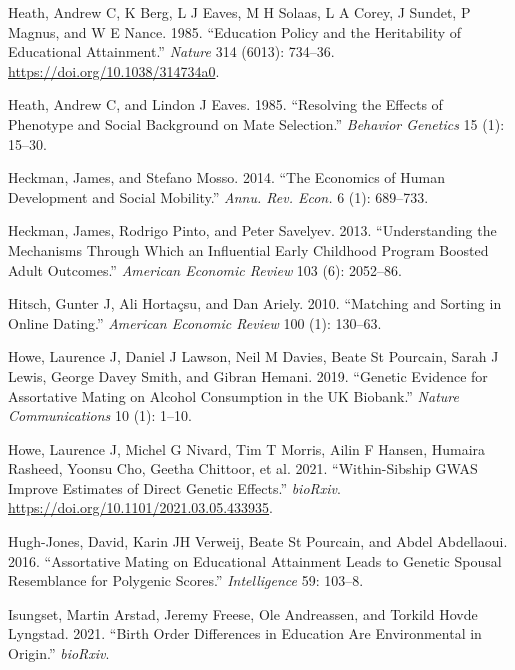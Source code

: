 \documentclass[
  12pt,
]{article}
\newlength{\cslhangindent}
\newlength{\cslentryspacingunit} %
\newenvironment{CSLReferences}[2] %
 {%
  \setlength{\parindent}{0pt}
  \ifodd #1
  \let\oldpar\par
  \def\par{\hangindent=\cslhangindent\oldpar}
  \fi
  \setlength{\parskip}{#2\cslentryspacingunit}
 }%
 {}
\theoremstyle{definition}
\theoremstyle{definition}
\theoremstyle{definition}
\theoremstyle{definition}
\theoremstyle{remark}
\begin{document}
\begin{CSLReferences}{1}{0}
\leavevmode{}%
Heath, Andrew C, K Berg, L J Eaves, M H Solaas, L A Corey, J Sundet, P Magnus, and W E Nance. 1985. {``Education Policy and the Heritability of Educational Attainment.''} \emph{Nature} 314 (6013): 734--36. \url{https://doi.org/10.1038/314734a0}.

\leavevmode{}%
Heath, Andrew C, and Lindon J Eaves. 1985. {``Resolving the Effects of Phenotype and Social Background on Mate Selection.''} \emph{Behavior Genetics} 15 (1): 15--30.

\leavevmode{}%
Heckman, James, and Stefano Mosso. 2014. {``The Economics of Human Development and Social Mobility.''} \emph{Annu. Rev. Econ.} 6 (1): 689--733.

\leavevmode{}%
Heckman, James, Rodrigo Pinto, and Peter Savelyev. 2013. {``Understanding the Mechanisms Through Which an Influential Early Childhood Program Boosted Adult Outcomes.''} \emph{American Economic Review} 103 (6): 2052--86.

\leavevmode{}%
Hitsch, Gunter J, Ali Hortaçsu, and Dan Ariely. 2010. {``Matching and Sorting in Online Dating.''} \emph{American Economic Review} 100 (1): 130--63.

\leavevmode{}%
Howe, Laurence J, Daniel J Lawson, Neil M Davies, Beate St Pourcain, Sarah J Lewis, George Davey Smith, and Gibran Hemani. 2019. {``Genetic Evidence for Assortative Mating on Alcohol Consumption in the UK Biobank.''} \emph{Nature Communications} 10 (1): 1--10.

\leavevmode{}%
Howe, Laurence J, Michel G Nivard, Tim T Morris, Ailin F Hansen, Humaira Rasheed, Yoonsu Cho, Geetha Chittoor, et al. 2021. {``Within-Sibship GWAS Improve Estimates of Direct Genetic Effects.''} \emph{bioRxiv}. \url{https://doi.org/10.1101/2021.03.05.433935}.

\leavevmode{}%
Hugh-Jones, David, Karin JH Verweij, Beate St Pourcain, and Abdel Abdellaoui. 2016. {``Assortative Mating on Educational Attainment Leads to Genetic Spousal Resemblance for Polygenic Scores.''} \emph{Intelligence} 59: 103--8.

\leavevmode{}%
Isungset, Martin Arstad, Jeremy Freese, Ole Andreassen, and Torkild Hovde Lyngstad. 2021. {``Birth Order Differences in Education Are Environmental in Origin.''} \emph{bioRxiv}.


\end{CSLReferences}
\end{document}

